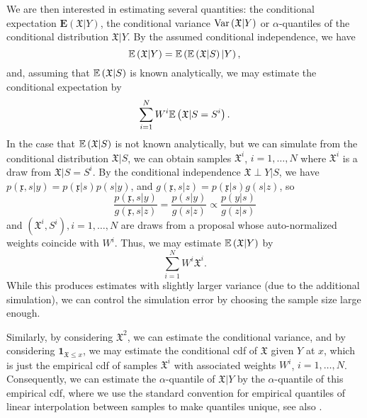 We are then interested in estimating several quantities: the conditional expectation $\mathbf E \left( \mathfrak X | Y \right)$, the conditional variance $\operatorname{Var} \left( \mathfrak X | Y \right)$ or $\alpha$-quantiles of the conditional distribution $\mathfrak X | Y$. By the assumed conditional independence, we have
$$
    \mathbb E \left( \mathfrak X | Y\right) = \mathbb E \left( \mathbb E \left( \mathfrak X | S \right) | Y \right),
$$
and, assuming that $\mathbb E \left( \mathfrak X | S \right)$ is known analytically, we may estimate the conditional expectation by
$$
\sum_{i = 1}^N W^{i} \mathbb E \left( \mathfrak X | S = S^{i} \right).
$$
In the case that $\mathbb E \left( \mathfrak X | S \right)$ is not known analytically, but we can simulate from the conditional distribution $\mathfrak X | S$, we can obtain samples $\mathfrak X^{i}$, $i = 1, \dots, N$ where $\mathfrak X^{i}$ is a draw from $\mathfrak X| S = S^{i}$. By the conditional independence $\mathfrak X \perp Y | S$, we have $p(\mathfrak x, s | y) = p(\mathfrak x | s) p(s | y)$, and $g(\mathfrak x, s | z) = p(\mathfrak x | s)g(s|z)$, so 
$$
    \frac{p(\mathfrak x, s|y)}{g(\mathfrak x, s | z)} = \frac{p(s | y)}{g(s|z)} \propto \frac{p(y|s)}{g(z|s)}
$$
and $(\mathfrak X^{i}, S^{i}), i = 1,\dots, N$ are draws from a proposal whose auto-normalized weights coincide with $W^{i}$. Thus, we may estimate $\mathbb E \left( \mathfrak X | Y \right)$ by
$$
    \sum_{i = 1}^N W^{i} \mathfrak X^{i}.
$$
While this produces estimates with slightly larger variance (due to the additional simulation), we can control the simulation error by choosing the sample size large enough.

Similarly, by considering $\mathfrak X^{2}$, we can estimate the conditional variance, and by considering $\mathbf 1 _{\mathfrak X \leq x}$, we may estimate the conditional \acrlong{cdf} of $\mathfrak X$ given $Y$ at $x$, which is just the empirical \acrshort{cdf} of samples $\mathfrak X^{i}$ with associated weights $W^{i}$, $i = 1,\dots, N$.
Consequently, we can estimate the $\alpha$-quantile of $\mathfrak X | Y$ by the $\alpha$-quantile of this empirical \acrshort{cdf}, where we use the standard convention for empirical quantiles of linear interpolation between samples to make quantiles unique, see also \citep[Section 11.5.3]{Durbin2012Time}.